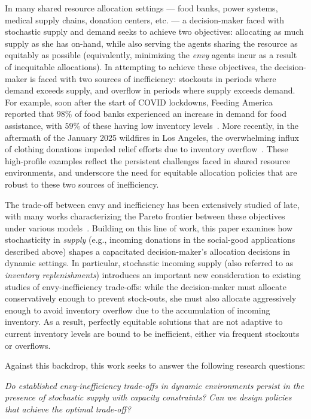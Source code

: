 \documentclass[mnsc,nonblindrev]{informs3}
\begin{document}
In many shared resource allocation settings --- food banks, power systems, medical supply chains, donation centers, etc. --- a decision-maker faced with stochastic supply and demand seeks to achieve two objectives: allocating as much supply as she has on-hand, while also serving the agents sharing the resource as equitably as possible (equivalently, minimizing the {\it envy} agents incur as a result of inequitable allocations).  In attempting to achieve these objectives, the decision-maker is faced with two sources of inefficiency: stockouts in periods where demand exceeds supply, and overflow in periods where supply exceeds demand. For example, soon after the start of COVID lockdowns, Feeding America reported that $98\%$ of food banks experienced an increase in demand for food assistance, with
$59\%$ of these having low inventory levels~\citep{feedingamerica2020}.
More recently, in the aftermath of the January 2025 wildfires in Los Angeles, 
the overwhelming influx of clothing donations impeded relief efforts due to inventory overflow~\citep{guardian2025wildfires}. 
These high-profile examples reflect the persistent challenges faced in shared resource environments, and underscore the need for equitable allocation policies that are robust to these two sources of inefficiency.

The trade-off between envy and inefficiency has been extensively studied of late, with many works characterizing the Pareto frontier between these objectives under various models~\citep{bertsimas2011price,lien2014sequential,donahue2020fairness,manshadi2021fair,sinclair2021sequential,banerjee2024online,liao2022nonstationary,yin2022optimal}. 
Building on this line of work, this paper examines how stochasticity in \emph{supply} (e.g., incoming donations in the social-good applications described above) shapes a capacitated decision-maker's allocation decisions in dynamic settings. In particular, stochastic incoming supply (also referred to as {\it inventory replenishments}) introduces an important new consideration to existing studies of envy-inefficiency trade-offs: while the decision-maker must allocate conservatively enough to prevent stock-outs, she must also allocate aggressively enough to avoid inventory overflow due to the accumulation of incoming inventory. As a result, perfectly equitable solutions that are not adaptive to current inventory levels are bound to be inefficient, either via frequent stockouts or overflows.

Against this backdrop, this work seeks to answer the following research questions:
\begin{center}
{\em 
Do established envy-inefficiency trade-offs in dynamic environments persist in the presence of stochastic supply with capacity constraints? Can we design policies that achieve the optimal trade-off?
}
\end{center}
\end{document}

